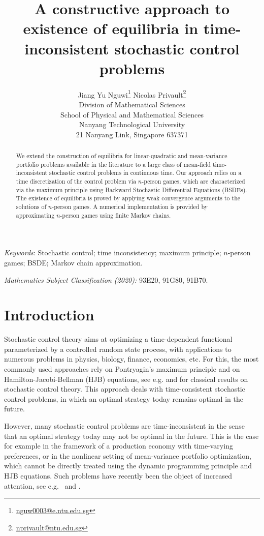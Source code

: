 \documentclass[12pt]{article}
\title{\Huge
A constructive approach to existence of equilibria in time-inconsistent stochastic control problems
}
\author{
 Jiang Yu Nguwi\footnote{\href{mailto:nguw0003@e.ntu.edu.sg}{nguw0003@e.ntu.edu.sg}
 }
 \qquad Nicolas Privault\footnote{
\href{mailto:nprivault@ntu.edu.sg}{nprivault@ntu.edu.sg}
 }
 \\
\small
Division of Mathematical Sciences
\\
\small
School of Physical and Mathematical Sciences
\\
\small
Nanyang Technological University
\\
\small
21 Nanyang Link, Singapore 637371
}
\theoremstyle{named}
\numberwithin{equation}{section}
\let\oldcitet=\citet
\renewcommand{\cite}[1]{\textcolor[rgb]{0,0,1}{\oldcitet{#1}}}
\renewcommand{\citet}[1]{\textcolor[rgb]{0,0,1}{\oldcitet{#1}}}
\begin{document}
\maketitle

\baselineskip0.6cm

\vspace{-0.6cm}

\begin{abstract}
    We extend the construction of equilibria
    for linear-quadratic and
    mean-variance portfolio problems
    available in the literature
    to a large class of mean-field time-inconsistent
    stochastic control problems
    in continuous time.
Our approach relies on a time discretization of the control problem via $n$-person games, which are characterized via the maximum principle using Backward Stochastic Differential Equations (BSDEs). The existence of equilibria is proved by applying weak convergence arguments to the solutions of $n$-person games. A numerical implementation is provided by approximating $n$-person games using finite Markov chains.
\end{abstract}

\noindent
{\em Keywords}: Stochastic control; time inconsistency; maximum principle; ${n}$-person games; BSDE; Markov chain approximation.

\noindent
    {\em Mathematics Subject Classification (2020):}
        93E20, 91G80, 91B70.

\baselineskip0.7cm

\parskip-0.1cm

\section{Introduction}
Stochastic control theory aims at
 optimizing a
    time-dependent
functional
    parameterized
by a controlled random state process,
with
    applications
    to numerous problems in physics, %
     biology, finance, economics, etc.
For this, the most commonly used approaches rely on
 Pontryagin's maximum principle and on
 Hamilton-Jacobi-Bellman (HJB) equations,
 see e.g. \cite{yong1999stochastic} and \cite{fleming2006controlled}
 for classical results on stochastic control theory.
     This approach deals with time-consistent stochastic control problems,
     in which an optimal strategy today remains optimal in the future.

\medskip

    However, many stochastic control problems are time-inconsistent
    in the sense that an optimal strategy today may not be optimal in the future.
    This is the case for example in the framework of a
    production economy with time-varying preferences,
    or in the nonlinear setting of mean-variance
    portfolio optimization, which cannot be directly treated using
    the dynamic programming principle and HJB equations.
    Such problems have recently been the
    object of increased attention, see e.g.\
    \cite{bjork2014theory} and \cite{bjork2017time}.
\end{document}
